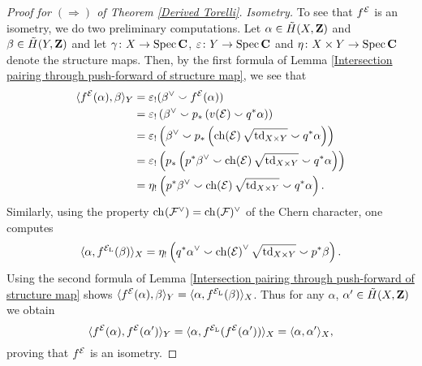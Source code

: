\begin{proof}[Proof for $(\Rightarrow)$ of Theorem \ref{Derived Torelli}]
    \vspace{0.3cm}
    \noindent
    \textsl{Isometry.}
    To see that $f^{\mathcal E}$ is an isometry, we do two preliminary computations. Let $\alpha \in \,\tilde{\!{H}}(X, \mathbf Z)$ and $\beta \in \,\tilde{\!{H}}(Y, \mathbf Z)$ and let $\gamma \colon X \to \operatorname{Spec}\mathbf C$, $\varepsilon \colon Y \to \operatorname{Spec}\mathbf C$ and $\eta \colon X \times Y \to \operatorname{Spec}\mathbf C$ denote the structure maps. Then, by the first formula of Lemma \ref{Intersection pairing through push-forward of structure map}, we see that
    \begin{align*}
        \pairing{\fmcoh{\E}(\alpha)}{\beta}_Y &= \varepsilon_!(\beta^\vee \smallsmile \fmcoh{\E}(\alpha))
        \\
        &= \varepsilon_!\left(
            \beta^\vee \smallsmile p_*\left(v(\E) \smallsmile q^*\alpha\right)\right) 
        \\
        &= \varepsilon_!\left(
            \beta^\vee \smallsmile p_*\left(\ch{\E}
            {\sqrt{\tdclass{X \times Y}}}
            \smallsmile q^*\alpha\right)
        \right) 
        \\
        &= \varepsilon_!\left( 
            p_*\left(
                p^*\beta^\vee \smallsmile \ch{\E}
                {\sqrt{\tdclass{X \times Y}}}
                \smallsmile q^*\alpha
            \right)
        \right) \\
        &= \eta_!\left(
            p^*\beta^\vee \smallsmile \ch{\E}
                {\sqrt{\tdclass{X \times Y}}}
                \smallsmile q^*\alpha
        \right).
    \end{align*}
    Similarly, using the property $\ch[](\F^\vee) = \ch[](\F)^\vee$ of the Chern character, one computes
    \[
        \pairing{\alpha}{\fmcoh{\ladj{\E}}(\beta)}_X = \eta_!\left(
            q^*\alpha^\vee \smallsmile \ch{\E}^\vee
                {\sqrt{\tdclass{X \times Y}}}
                \smallsmile p^*\beta
        \right).
    \]
    Using the second formula of Lemma \ref{Intersection pairing through push-forward of structure map} shows $\langle f^{\mathcal E}(\alpha), \beta \rangle_Y = \langle \alpha, f^{\mathcal E_\mathrm{L}}(\beta) \rangle_X$.
    Thus for any $\alpha$, $\alpha' \in \,\tilde{\!{H}}(X, \mathbf Z)$ we obtain
    \[
        \langle f^{\mathcal E}(\alpha), f^{\mathcal E}(\alpha') \rangle_Y = 
        \langle \alpha, f^{\mathcal E_\mathrm{L}}(f^{\mathcal E}(\alpha')) \rangle_X = 
        \langle \alpha, \alpha' \rangle_X,
    \]       
    proving that $f^{\mathcal E}$ is an isometry. 

    \vspace{0.3cm}


\end{proof}
